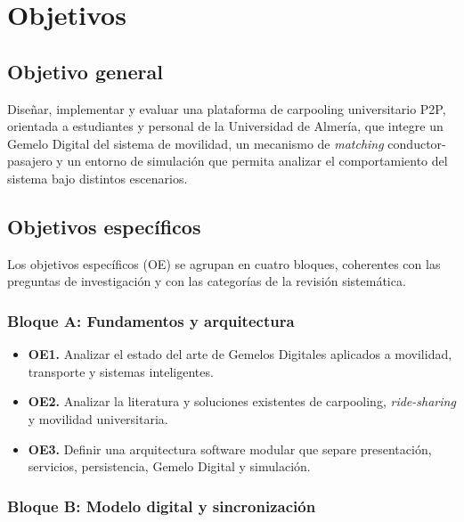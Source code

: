
\chapter{Objetivos}
\label{ch:objetivos}

\section{Objetivo general}

Diseñar, implementar y evaluar una plataforma de carpooling universitario P2P, orientada a estudiantes y personal de la Universidad de Almería, que integre un Gemelo Digital del sistema de movilidad, un mecanismo de \textit{matching} conductor-pasajero y un entorno de simulación que permita analizar el comportamiento del sistema bajo distintos escenarios.

\section{Objetivos específicos}

Los objetivos específicos (OE) se agrupan en cuatro bloques, coherentes con las preguntas de investigación y con las categorías de la revisión sistemática.

\subsection{Bloque A: Fundamentos y arquitectura}

\begin{itemize}
    \item \textbf{OE1.} Analizar el estado del arte de Gemelos Digitales aplicados a movilidad, transporte y sistemas inteligentes.
    \item \textbf{OE2.} Analizar la literatura y soluciones existentes de carpooling, \textit{ride-sharing} y movilidad universitaria.
    \item \textbf{OE3.} Definir una arquitectura software modular que separe presentación, servicios, persistencia, Gemelo Digital y simulación.
\end{itemize}

\subsection{Bloque B: Modelo digital y sincronización}

